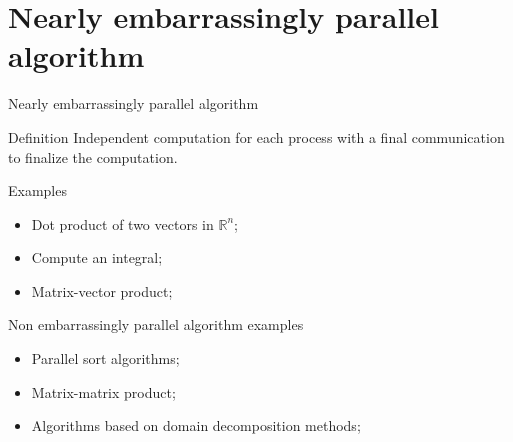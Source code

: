 \documentclass[compress,10pt,aspectratio=169]{beamer}
\begin{document}
\section{Nearly embarrassingly parallel algorithm}

\begin{frame}[fragile]{Nearly embarrassingly parallel algorithm}
    \scriptsize
    \begin{block}{\small Definition}
        Independent computation for each process with a final communication to finalize the computation.
    \end{block}

    \begin{exampleblock}{\small Examples}
        \begin{itemize}
            \item Dot product of two vectors in $\mathbb{R}^{n}$;
            \item Compute an integral;
            \item Matrix-vector product;
        \end{itemize}
    \end{exampleblock}

    \begin{alertblock}{\small Non embarrassingly parallel algorithm examples}
      \begin{itemize}
      \item Parallel sort algorithms;
      \item Matrix-matrix product;
      \item Algorithms based on domain decomposition methods;
      \end{itemize}
    \end{alertblock}
\end{frame}
\end{document}
